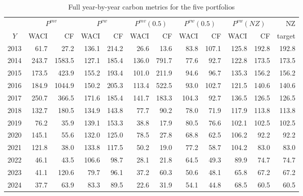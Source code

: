\documentclass[11pt,a4paper]{article}
\begin{document}
\begin{table}[H]
\centering
\caption{Full year-by-year carbon metrics for the five portfolios}
\label{tab:carbon-by-year}
\scriptsize
\setlength{\tabcolsep}{3.5pt}
\begin{tabular}{c rr rr rr rr rr r}
\toprule
& \multicolumn{2}{c}{$P^{mv}$} & \multicolumn{2}{c}{$P^{vw}$}
& \multicolumn{2}{c}{$P^{mv}(0.5)$} & \multicolumn{2}{c}{$P^{vw}(0.5)$}
& \multicolumn{2}{c}{$P^{vw}(NZ)$} & NZ \\
$Y$ & WACI & CF & WACI & CF & WACI & CF & WACI & CF & WACI & CF & target \\
\midrule
2013 &  61.7 &   27.2 & 136.1 & 214.2 &  26.6 &   13.6 &  83.8 & 107.1 & 125.8 & 192.8 & 192.8 \\
2014 & 243.7 & 1583.5 & 127.1 & 185.4 & 136.0 &  791.7 &  77.6 &  92.7 & 122.8 & 173.5 & 173.5 \\
2015 & 173.5 &  423.9 & 155.2 & 193.4 & 101.0 &  211.9 &  94.6 &  96.7 & 135.3 & 156.2 & 156.2 \\
2016 & 184.9 & 1044.9 & 150.2 & 205.3 & 113.4 &  522.5 &  93.0 & 102.7 & 121.5 & 140.6 & 140.6 \\
2017 & 250.7 &  366.5 & 171.6 & 185.4 & 141.7 &  183.3 & 104.3 &  92.7 & 136.5 & 126.5 & 126.5 \\
2018 & 132.7 &  180.5 & 134.9 & 143.8 &  77.7 &   90.2 &  78.0 &  71.9 & 117.9 & 113.8 & 113.8 \\
2019 &  76.2 &   35.9 & 139.1 & 153.3 &  38.8 &   17.9 &  80.5 &  76.6 & 102.1 & 102.5 & 102.5 \\
2020 & 145.1 &   55.6 & 132.0 & 125.0 &  78.5 &   27.8 &  68.8 &  62.5 & 106.2 &  92.2 &  92.2 \\
2021 & 121.8 &   38.0 & 133.8 & 117.5 &  50.2 &   19.0 &  77.2 &  58.7 & 104.2 &  83.0 &  83.0 \\
2022 &  46.1 &   43.5 & 106.6 &  98.7 &  28.1 &   21.8 &  64.5 &  49.3 &  89.9 &  74.7 &  74.7 \\
2023 &  41.1 &  120.6 &  79.7 &  96.1 &  37.2 &   60.3 &  50.6 &  48.1 &  65.8 &  67.2 &  67.2 \\
2024 &  37.7 &   63.9 &  83.3 &  89.5 &  22.6 &   31.9 &  54.1 &  44.8 &  68.5 &  60.5 &  60.5 \\
\bottomrule
\end{tabular}
\end{table}

\end{document}
